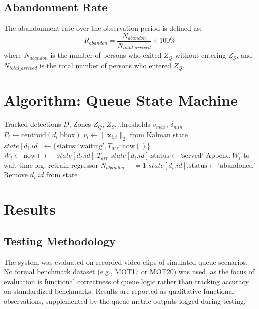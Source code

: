 \documentclass[journal, twocolumn]{IEEEtran}
\begin{document}
\subsection{Abandonment Rate}
The abandonment rate over the observation period is defined as:
\begin{equation}
R_{abandon} = \frac{N_{abandon}}{N_{total\_arrived}} \times 100\%
\end{equation}
where $N_{abandon}$ is the number of persons who exited $Z_Q$ without entering $Z_S$, and $N_{total\_arrived}$ is the total number of persons who entered $Z_Q$.

\section{Algorithm: Queue State Machine}

\begin{algorithm}[H]
\caption{ROI-Based Queue State Management}
\begin{algorithmic}[1]
\REQUIRE Tracked detections $D$, Zones $Z_Q$, $Z_S$, thresholds $v_{max}$, $\delta_{min}$
    \STATE $P_i \gets \text{centroid}(d_i.\text{bbox})$
    \STATE $v_i \gets \|\dot{\mathbf{x}}_{i,t}\|_2$ from Kalman state
        \STATE $state[d_i.id] \gets \{\text{status}: \text{`waiting'}, T_{arr}: \text{now}()\}$
        \STATE $W_i \gets \text{now}() - state[d_i.id].T_{arr}$
        \STATE $state[d_i.id].\text{status} \gets \text{`served'}$
        \STATE Append $W_i$ to wait time log; retrain regressor
            \STATE $N_{abandon} \mathrel{+}= 1$
            \STATE $state[d_i.id].\text{status} \gets \text{`abandoned'}$
        \ENDIF
        \STATE Remove $d_i.id$ from state
    \ENDIF
\ENDFOR
\end{algorithmic}
\end{algorithm}

\section{Results}
\label{sec:results}

\subsection{Testing Methodology}
The system was evaluated on recorded video clips of simulated queue scenarios. No formal benchmark dataset (e.g., MOT17 or MOT20) was used, as the focus of evaluation is functional correctness of queue logic rather than tracking accuracy on standardized benchmarks. Results are reported as qualitative functional observations, supplemented by the queue metric outputs logged during testing.
\end{document}
